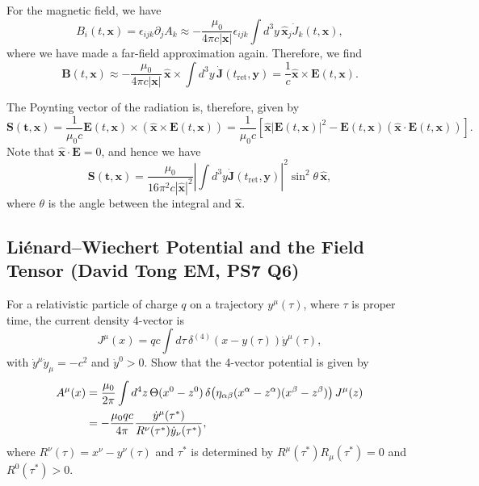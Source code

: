 For the magnetic field, we have
\begin{equation}
    B_i(t,\mathbf{x}) = \epsilon_{ijk}\partial_jA_k \approx -\frac{\mu_0}{4\pi c|\mathbf{x}|}\epsilon_{ijk}\int d^3y\,\hat{\mathbf{x}}_j\dot{J}_k(t,\mathbf{x}),
\end{equation}
where we have made a far-field approximation again. Therefore, we find
\begin{equation}
    \mathbf{B}(t,\mathbf{x}) \approx -\frac{\mu_0}{4\pi c|\mathbf{x}|}\,
  \hat{\mathbf{x}}\times\int d^3y\,\dot{\mathbf{J}}(t_{\mathrm{ret}},\mathbf{y})
  = \frac{1}{c}\hat{\mathbf{x}}\times\mathbf{E}(t,\mathbf{x}).
\end{equation}

The Poynting vector of the radiation is, therefore, given by
\begin{equation}
    \mathbf{S(t,\mathbf{x})} = \frac{1}{\mu_0 c}\mathbf{E}(t,\mathbf{x})\times\left(\hat{\mathbf{x}}\times\mathbf{E}(t,\mathbf{x})\right) = \frac{1}{\mu_0c}[\hat{\mathbf{x}}|\mathbf{E}(t,\mathbf{x})|^2 - \mathbf{E}(t,\mathbf{x})(\hat{\mathbf{x}}\cdot\mathbf{E}(t,\mathbf{x}))].
\end{equation}
Note that $\hat{\mathbf{x}}\cdot\mathbf{E}=0$, and hence we have
\begin{equation}
    \mathbf{S(t,\mathbf{x})}=\frac{\mu_0}{16\pi^2c|\hat{\mathbf{x}}|^2}\left|\int d^3y\dot{\mathbf{J}}(t_{\mathrm{ret}},\mathbf{y})\right|^2\sin^2\theta \,\hat{\mathbf{x}},
\end{equation}
where $\theta$ is the angle between the integral and $\hat{\mathbf{x}}$.

\subsection{Liénard--Wiechert Potential and the Field Tensor (David Tong EM, PS7 Q6)}
\label{sec:lienard-wiechert}

For a relativistic particle of charge $q$ on a trajectory
$y^\mu(\tau)$, where $\tau$ is proper time, the current density 4-vector is
\begin{equation}
  J^\mu(x) = qc\int d\tau\,\delta^{(4)}(x-y(\tau))\dot{y}^\mu(\tau),
\end{equation}
with $\dot{y}^\mu\dot{y}_\mu = -c^2$ and $\dot{y}^0 > 0$. Show that the
4-vector potential is given by
\begin{align}
  A^\mu(x)
  &= \frac{\mu_0}{2\pi}\int d^4z\,
     \Theta(x^0-z^0)\,\delta\!\left(\eta_{\alpha\beta}
     (x^\alpha-z^\alpha)(x^\beta-z^\beta)\right)J^\mu(z) \notag\\
  &= -\frac{\mu_0 qc}{4\pi}
     \frac{\dot{y}^\mu(\tau^*)}{R^\nu(\tau^*)\dot{y}_\nu(\tau^*)},
\end{align}
where $R^\nu(\tau) = x^\nu - y^\nu(\tau)$ and $\tau^*$ is determined by
$R^\mu(\tau^*)R_\mu(\tau^*) = 0$ and $R^0(\tau^*) > 0$.


